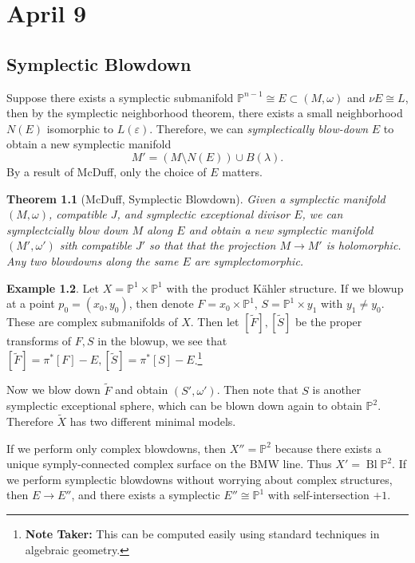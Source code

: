 \documentclass[leqno, openany]{memoir}
\newtheorem{thm}{Theorem}[chapter]
\theoremstyle{definition}
\newtheorem{exm}[thm]{Example}
\theoremstyle{remark}
\theoremstyle{plain}
\theoremstyle{definition}
\theoremstyle{remark}
\renewcommand{\P}{\mathbb{P}}
\newcommand{\ep}{\varepsilon}
\newcommand{\wt}[1]{\widetilde{#1}}
\DeclareMathOperator{\Bl}{Bl} %
\begin{document}
    \chapter{April 9}%
    \label{cha:april_9}
    
    \section{Symplectic Blowdown}%
    \label{sec:symplectic_blowdown}
    
    Suppose there exists a symplectic submanifold $\P^{n-1} \cong E \subset (M, \omega)$ and $\nu E \cong L$, then by the symplectic neighborhood theorem, there exists a small neighborhood $N(E)$ isomorphic to $L(\ep)$. Therefore, we can \textit{symplectically blow-down} $E$ to obtain a new symplectic manifold 
    \[ M' = (M \setminus N(E)) \cup B(\lambda). \]
    By a result of McDuff, only the choice of $E$ matters.

    \begin{thm}[McDuff, Symplectic Blowdown]
        Given a symplectic manifold $(M, \omega)$, compatible $J$, and symplectic exceptional divisor $E$, we can symplectcially blow down $M$ along $E$ and obtain a new symplectic manifold $(M', \omega')$ sith compatible $J'$ so that that the projection $M \to M'$ is holomorphic. Any two blowdowns along the same $E$ are symplectomorphic.
    \end{thm}

    \begin{exm}
        Let $X = \P^1 \times \P^1$ with the product K\"ahler structure. If we blowup at a point $p_0 = (x_0, y_0)$, then denote $F = x_0 \times \P^1$, $S = \P^1 \times y_1$ with $y_1 \neq y_0$. These are complex submanifolds of $X$. Then let $[\wt{F}], [\wt{S}]$ be the proper transforms of $F, S$ in the blowup, we see that $[\wt{F}] = \pi^* [F] - E, [\wt{S}] = \pi^*[S] - E$.\footnote{\textbf{Note Taker:} This can be computed easily using standard techniques in algebraic geometry.}

        Now we blow down $\wt{F}$ and obtain $(S', \omega')$. Then note that $S$ is another symplectic exceptional sphere, which can be blown down again to obtain $\P^2$. Therefore $\wt{X}$ has two different minimal models.

        If we perform only complex blowdowns, then $X'' = \P^2$ because there exists a unique symply-connected complex surface on the BMW line. Thus $X' = \Bl \P^2$. If we perform symplectic blowdowns without worrying about complex structures, then $E \to E''$, and there exists a symplectic $E'' \cong \P^1$ with self-intersection $+1$.
    \end{exm}
\end{document}
